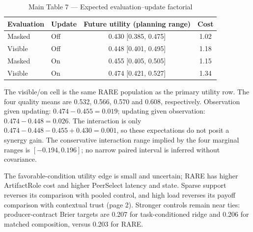\documentclass[10pt]{article}
\newcommand{\rng}[1]{{\footnotesize[#1]}}
\begin{document}
\small
\begin{table}[H]
\centering
\caption*{Main Table 7 --- Expected evaluation--update factorial}
\begin{tabular}{@{}llcc@{}}
\toprule
Evaluation & Update & Future utility (planning range) & Cost\\
\midrule
Masked & Off & 0.430 \rng{0.385, 0.475} & 1.02\\
Visible & Off & 0.448 \rng{0.401, 0.495} & 1.18\\
Masked & On & 0.455 \rng{0.405, 0.505} & 1.15\\
Visible & On & 0.474 \rng{0.421, 0.527} & 1.34\\
\bottomrule
\end{tabular}
\end{table}
\footnotesize
The visible/on cell is the same RARE population as the primary utility row.
The four quality means are 0.532, 0.566, 0.570 and 0.608, respectively.
Observation given updating: $0.474-0.455=0.019$; updating given observation:
$0.474-0.448=0.026$. The interaction is only
$0.474-0.448-0.455+0.430=0.001$, so these expectations do not posit a synergy gain.
The conservative interaction range implied by the four marginal ranges is
$[-0.194,0.196]$; no narrow paired interval is inferred without covariance.

\vspace{3mm}\small
The favorable-condition utility edge is small and uncertain; RARE has higher
ArtifactRole cost and higher PeerSelect latency and state. Sparse support reverses its comparison with pooled control, and
high load reverses its payoff comparison with contextual trust (page 2).
Stronger controls remain near ties: producer-contract Brier targets are 0.207 for
task-conditioned ridge and 0.206 for matched composition, versus 0.203 for RARE.
\end{document}
